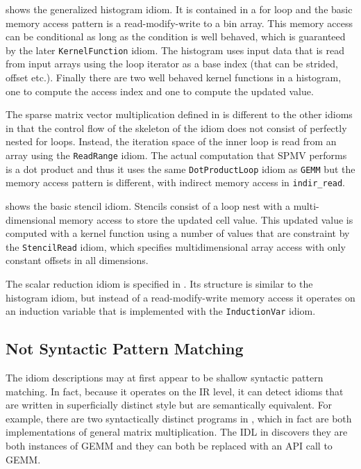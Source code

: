      shows the generalized histogram idiom.
    It is contained in a for loop and the basic memory access pattern is a
    read-modify-write to a bin array.
    This memory access can be conditional as long as the condition is well
    behaved, which is guaranteed by the later
    \texttt{KernelFunction} idiom.
    The histogram uses input data that is read from input arrays using the loop iterator as a base index (that can be
    strided, offset etc.).
    Finally there are two well behaved kernel functions in a histogram, one to compute the access index and one to compute
    the updated value.

The sparse matrix vector multiplication defined in  is different to the other idioms in that
the control flow of the skeleton of the idiom does not consist of perfectly nested for loops.
Instead, the iteration space of the inner loop is read from an array using the \texttt{ReadRange} idiom.
The actual computation that SPMV performs is a dot product and thus it uses the same \texttt{DotProductLoop} idiom as
\texttt{GEMM} but the memory access pattern is different, with indirect memory access in \texttt{indir\_read}.

     shows the basic stencil idiom.
    Stencils consist of a loop nest with a multi-dimensional memory access to
    store the updated cell value.
    This updated value is computed with a kernel function using a number of
    values that are constraint by the
    \texttt{StencilRead} idiom, which specifies multidimensional array access
    with only constant offsets in all dimensions.

The scalar reduction idiom is specified in .
Its structure is similar to the histogram idiom, but instead of a read-modify-write memory access
it operates on an induction variable that is implemented with the \texttt{InductionVar} idiom.

\subsection{Not Syntactic Pattern Matching}
The idiom descriptions may at first appear to be shallow syntactic pattern matching.
In fact, because it operates on the IR level, it can detect idioms that are written in superficially distinct style but are semantically equivalent.
For example, there are two syntactically distinct programs in , which in fact are both implementations of general matrix multiplication.
The IDL in  discovers they are both instances of GEMM and they can both be replaced with an API call to GEMM.

